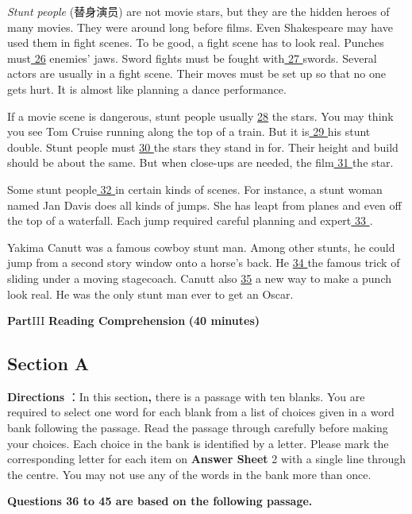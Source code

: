 \documentclass[UTF8,11pt]{ctexart}
\begin{document}
\textit{Stunt people} (替身演员) are not movie stars, but they are the hidden heroes of many movies. They were around long before films. Even Shakespeare may have used them in fight scenes. To be good, a fight scene has to look real. Punches must\uline{ 26} enemies’ jaws. Sword fights must be fought with\uline{ 27 }swords. Several actors are usually in a fight scene. Their moves must be set up so that no one gets hurt. It is almost like planning a dance performance.


If a movie scene is dangerous, stunt people usually \uline{28} the stars. You may think you see Tom Cruise running along the top of a train. But it is\uline{ 29 }his stunt double. Stunt people must \uline{30 }the stars they stand in for. Their height and build should be about the same. But when close-ups are needed, the film\uline{ 31 }the star.


Some stunt people\uline{ 32 }in certain kinds of scenes. For instance, a stunt woman named Jan Davis does all kinds of jumps. She has leapt from planes and even off the top of a waterfall. Each jump required careful planning and expert\uline{ 33 }.


Yakima Canutt was a famous cowboy stunt man. Among other stunts, he could jump from a second story window onto a horse’s back. He \uline{34 }the famous trick of sliding under a moving stagecoach. Canutt also \uline{35} a new way to make a punch look real. He was the only stunt man ever to get an Oscar.


\textbf{Part}III \textbf{Reading Comprehension} \textbf{(40 minutes)}


\subsection*{\textbf{Section A}}


\textbf{Directions} ：In this section\textbf{,} there is a passage with ten blanks. You are required to select one word for each blank from a list of choices given in a word bank following the passage. Read the passage through carefully before making your choices. Each choice in the bank is identified by a letter. Please mark the corresponding letter for each item on\textbf{ Answer Sheet} 2 with a single line through the centre. You may not use any of the words in the bank more than once.


\textbf{Questions 36 to 45 are based on the following passage.}
\end{document}
